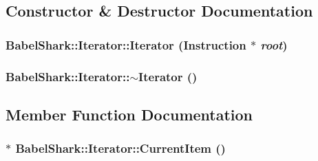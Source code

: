 \subsection{Constructor \& Destructor Documentation}
\hypertarget{class_babel_shark_1_1_iterator_b30acda521d46ac44cb848cf1726382b}{
\subsubsection[{Iterator}]{\setlength{\rightskip}{0pt plus 5cm}BabelShark::Iterator::Iterator ({\bf Instruction} $\ast$ {\em root})}}
\label{class_babel_shark_1_1_iterator_b30acda521d46ac44cb848cf1726382b}


\hypertarget{class_babel_shark_1_1_iterator_a3b5d3ba327b40b256450dc56c12e09e}{
\subsubsection[{$\sim$Iterator}]{\setlength{\rightskip}{0pt plus 5cm}BabelShark::Iterator::$\sim$Iterator ()}}
\label{class_babel_shark_1_1_iterator_a3b5d3ba327b40b256450dc56c12e09e}




\subsection{Member Function Documentation}
\hypertarget{class_babel_shark_1_1_iterator_47a9ff22fbd2dc6fdc935f22a7560ce1}{
\subsubsection[{CurrentItem}]{ $\ast$ BabelShark::Iterator::CurrentItem ()}}
\label{class_babel_shark_1_1_iterator_47a9ff22fbd2dc6fdc935f22a7560ce1}




